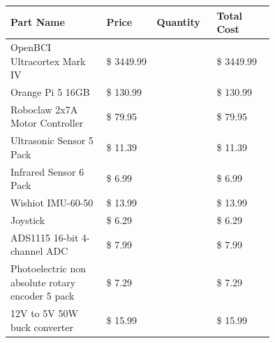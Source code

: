 \documentclass[conference]{IEEEtran}
\begin{document}
    \begin{table}[htbp]
        \centering
        
        \begin{tabular}{|>{\raggedright\arraybackslash}p{0.30\linewidth}|>{\raggedright\arraybackslash}p{0.15\linewidth}|>{\raggedright\arraybackslash}p{0.12\linewidth}|>{\raggedright\arraybackslash}p{0.18\linewidth}|}
            
            \hline
            \rowcolor{black!20} 
            {\textbf{Part Name}} 
            & \textbf{Price} 
            & \textbf{Quantity} 
            & \textbf{Total Cost} 
            \\
            \hline

            \rowcolor{black!10}
            OpenBCI Ultracortex Mark IV & \$ 3449.99 & 1 & \$ 3449.99 \\

            \rowcolor{black!5}
            Orange Pi 5 16GB & \$ 130.99 & 1 & \$ 130.99 \\



            \rowcolor{black!10}
              Roboclaw 2x7A Motor Controller & \$ 79.95 & 1 & \$ 79.95 \\

            \rowcolor{black!5}
             Ultrasonic Sensor 5 Pack & \$ 11.39 & 1 & \$ 11.39 \\

            \rowcolor{black!10}
             Infrared Sensor 6 Pack & \$ 6.99 & 1 & \$ 6.99 \\

            \rowcolor{black!5}
             Wishiot IMU-60-50 & \$ 13.99 & 1 & \$ 13.99 \\

            \rowcolor{black!10}
             Joystick & \$ 6.29 & 1 & \$ 6.29 \\

            \rowcolor{black!5}
             ADS1115 16-bit 4-channel ADC & \$ 7.99 & 1 & \$ 7.99 \\

            \rowcolor{black!10}
             Photoelectric non absolute rotary encoder 5 pack & \$ 7.29 & 1 & \$ 7.29 \\

            \rowcolor{black!5}
             12V to 5V 50W buck converter & \$ 15.99 & 1 & \$ 15.99 \\


\end{tabular}
\end{table}
\end{document}
